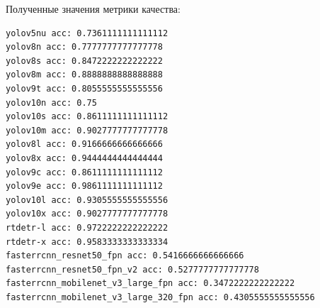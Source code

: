 \documentclass[../document.tex]{subfiles}
\begin{document}
 		\par Полученные значения метрики качества:
 		\begin{verbatim}
yolov5nu acc: 0.7361111111111112
yolov8n acc: 0.7777777777777778
yolov8s acc: 0.8472222222222222
yolov8m acc: 0.8888888888888888
yolov9t acc: 0.8055555555555556
yolov10n acc: 0.75
yolov10s acc: 0.8611111111111112
yolov10m acc: 0.9027777777777778
yolov8l acc: 0.9166666666666666
yolov8x acc: 0.9444444444444444
yolov9c acc: 0.8611111111111112
yolov9e acc: 0.9861111111111112
yolov10l acc: 0.9305555555555556
yolov10x acc: 0.9027777777777778
rtdetr-l acc: 0.9722222222222222
rtdetr-x acc: 0.9583333333333334
fasterrcnn_resnet50_fpn acc: 0.5416666666666666
fasterrcnn_resnet50_fpn_v2 acc: 0.5277777777777778
fasterrcnn_mobilenet_v3_large_fpn acc: 0.3472222222222222
fasterrcnn_mobilenet_v3_large_320_fpn acc: 0.4305555555555556
 		\end{verbatim}
\end{document}
